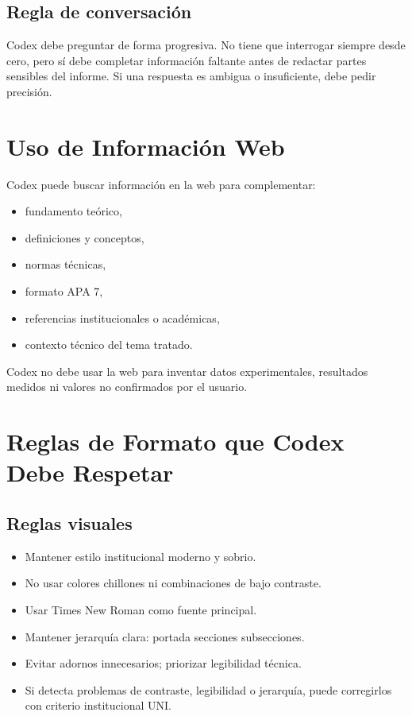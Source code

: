 \documentclass[12pt,a4paper]{article}
\begin{document}
\subsection{Regla de conversaci\'on}
Codex debe preguntar de forma progresiva. No tiene que interrogar siempre desde cero, pero s\'i debe completar informaci\'on faltante antes de redactar partes sensibles del informe. Si una respuesta es ambigua o insuficiente, debe pedir precisi\'on.

\section{Uso de Informaci\'on Web}
Codex puede buscar informaci\'on en la web para complementar:
\begin{itemize}
  \item fundamento te\'orico,
  \item definiciones y conceptos,
  \item normas t\'ecnicas,
  \item formato APA 7,
  \item referencias institucionales o acad\'emicas,
  \item contexto t\'ecnico del tema tratado.
\end{itemize}

Codex no debe usar la web para inventar datos experimentales, resultados medidos ni valores no confirmados por el usuario.

\section{Reglas de Formato que Codex Debe Respetar}
\subsection{Reglas visuales}
\begin{itemize}
  \item Mantener estilo institucional moderno y sobrio.
  \item No usar colores chillones ni combinaciones de bajo contraste.
  \item Usar Times New Roman como fuente principal.
  \item Mantener jerarqu\'ia clara: portada \textrightarrow{} secciones \textrightarrow{} subsecciones.
  \item Evitar adornos innecesarios; priorizar legibilidad t\'ecnica.
  \item Si detecta problemas de contraste, legibilidad o jerarqu\'ia, puede corregirlos con criterio institucional UNI.
\end{itemize}
\end{document}
